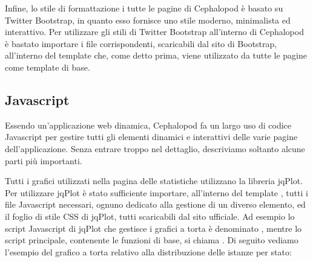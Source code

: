             Infine, lo stile di formattazione i tutte le pagine di Cephalopod è basato su Twitter Bootstrap, in quanto esso fornisce uno stile moderno, minimalista ed interattivo. Per utilizzare gli stili di Twitter Bootstrap all'interno di Cephalopod è bastato importare i file corrispondenti, scaricabili dal sito di Bootstrap, all'interno del template  che, come detto prima, viene utilizzato da tutte le pagine come template di base.
            
        \subsection{Javascript} \label{subsec:it;di;javascript}
        
            Essendo un'applicazione web dinamica, Cephalopod fa un largo uso di codice Javascript per gestire tutti gli elementi dinamici e interattivi delle varie pagine dell'applicazione. Senza entrare troppo nel dettaglio, descriviamo soltanto alcune parti più importanti.
            
            Tutti i grafici utilizzati nella pagina delle statistiche utilizzano la libreria jqPlot. Per utilizzare jqPlot è stato sufficiente importare, all'interno del template , tutti i file Javascript necessari, ognuno dedicato alla gestione di un diverso elemento, ed il foglio di stile \ac{CSS} di jqPlot, tutti scaricabili dal sito ufficiale. Ad esempio lo script Javascript di jqPlot che gestisce i grafici a torta è denominato , mentre lo script principale, contenente le funzioni di base, si chiama . Di seguito vediamo l'esempio del grafico a torta relativo alla distribuzione delle istanze per stato:
            
